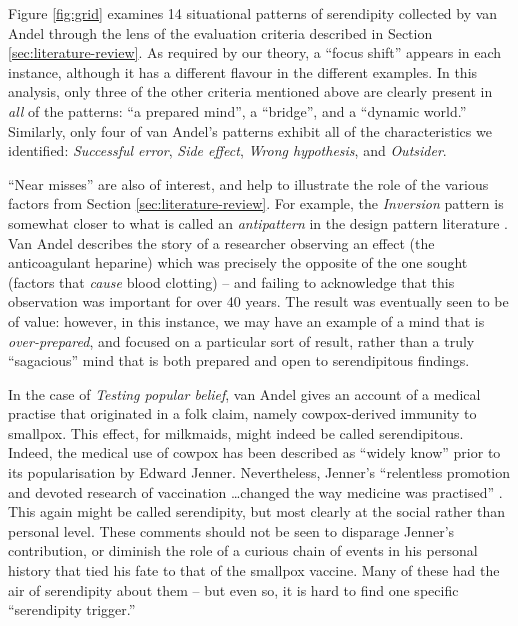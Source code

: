 Figure \ref{fig:grid} examines 14 situational patterns of serendipity
collected by van Andel \cite{van1994anatomy} through the lens of the evaluation
criteria described in Section \ref{sec:literature-review}.
%
As required by our theory, a ``focus shift'' appears in each instance,
although it has a different flavour in the different examples.  In
this analysis, only three of the other criteria mentioned above are
clearly present in \emph{all} of the patterns: ``a prepared mind'', a
``bridge'', and a ``dynamic world.''  Similarly, only four of van
Andel's patterns exhibit all of the characteristics we identified:
\emph{Successful error}, \emph{Side effect}, \emph{Wrong hypothesis},
and \emph{Outsider}.

``Near misses'' are also of interest, and help to illustrate the role
of the various factors from Section \ref{sec:literature-review}.
%
For example, the \emph{Inversion} pattern is somewhat closer to what is called an \emph{antipattern} in the design pattern literature \cite{brown1998antipatterns}.  Van Andel describes the story of a researcher observing an effect (the anticoagulant heparine) which was precisely the opposite of the one sought (factors that \emph{cause} blood clotting) -- and failing to acknowledge that this observation was important for over 40 years.  The result was eventually seen to be of value: however, in this instance, we may have an example of a mind that is \emph{over-prepared}, and focused on a particular sort of result, rather than a truly ``sagacious'' mind that is both prepared and open to serendipitous findings.

In the case of \emph{Testing popular belief}, van Andel gives an
account of a medical practise that originated in a folk claim, namely
cowpox-derived immunity to smallpox.  This effect, for milkmaids,
might indeed be called serendipitous.  Indeed, the medical use of
cowpox has been described as ``widely know'' \cite{riedel2005edward}
prior to its popularisation by Edward Jenner.  Nevertheless, 
Jenner's ``relentless promotion and devoted research of vaccination
\ldots changed the way medicine was practised'' \cite{riedel2005edward}.
This again might be called serendipity, but most clearly at the social
rather than personal level.  These comments should not be seen to
disparage Jenner's contribution, or diminish the role of a curious
chain of events in his personal history that tied his fate to that of
the smallpox vaccine.  Many of these had the air of serendipity about
them -- but even so, it is hard to find one specific ``serendipity
trigger.''
 
